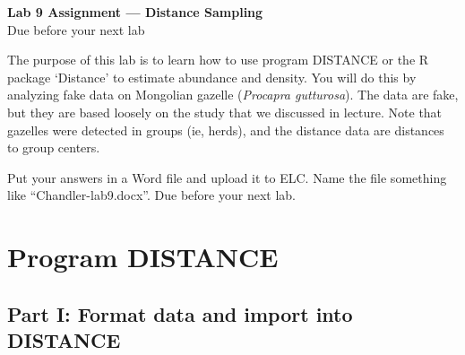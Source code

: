 \documentclass[12pt]{article}\usepackage[]{graphicx}\usepackage[]{color}
\begin{document}
{
  \Large
  \centering
  {\bf Lab 9 Assignment --- Distance Sampling} \\
  Due before your next lab \\
}

\vspace{10pt}


The purpose of this lab is to learn how to use program DISTANCE or the
R package `Distance' to estimate abundance and density. You will
do this by analyzing fake data on Mongolian gazelle ({\it Procapra
gutturosa}). The data are fake, but they are based loosely on the  
study that we discussed in lecture. Note that gazelles were detected
in groups (ie, herds), and the distance data are distances to group
centers. 

Put your answers in a Word file and upload it to ELC. Name the file
something like ``Chandler-lab9.docx''. Due before your next lab.  



\section*{Program DISTANCE}

\subsection*{\large Part I: Format data and import into DISTANCE}
\end{document}

